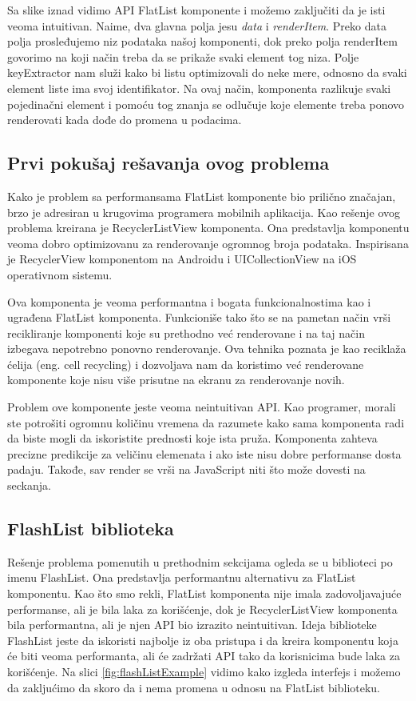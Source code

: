 \documentclass[12pt,oneside]{memoir}
\begin{document}
Sa slike iznad vidimo API FlatList komponente i možemo zaključiti da je isti veoma intuitivan. Naime, dva glavna polja jesu \textit{data} i \textit{renderItem}. Preko data polja prosleđujemo niz podataka našoj komponenti, dok preko polja renderItem govorimo na koji način treba da se prikaže svaki element tog niza. Polje keyExtractor nam služi kako bi listu optimizovali do neke mere, odnosno da svaki element liste ima svoj identifikator. Na ovaj način, komponenta razlikuje svaki pojedinačni element i pomoću tog znanja se odlučuje koje elemente treba ponovo renderovati kada dođe do promena u podacima.

\subsection{Prvi pokušaj rešavanja ovog problema}

Kako je problem sa performansama FlatList komponente bio prilično značajan, brzo je adresiran u krugovima programera mobilnih aplikacija. Kao rešenje ovog problema kreirana je RecyclerListView komponenta\cite{RecyclerListView}. Ona predstavlja komponentu veoma dobro optimizovanu za renderovanje ogromnog broja podataka. Inspirisana je RecyclerView komponentom na Androidu i UICollectionView na iOS operativnom sistemu. 


Ova komponenta je veoma performantna i bogata funkcionalnostima kao i ugrađena FlatList komponenta. Funkcioniše tako što se na pametan način vrši recikliranje komponenti koje su prethodno već renderovane i na taj način izbegava nepotrebno ponovno renderovanje. Ova tehnika poznata je kao reciklaža ćelija (eng. cell recycling) i dozvoljava nam da koristimo već renderovane komponente koje nisu više prisutne na ekranu za renderovanje novih.


Problem ove komponente jeste veoma neintuitivan API. Kao programer, morali ste potrošiti ogromnu količinu vremena da razumete kako sama komponenta radi da biste mogli da iskoristite prednosti koje ista pruža. Komponenta zahteva precizne predikcije za veličinu elemenata i ako iste nisu dobre performanse dosta padaju. Takođe, sav render se vrši na JavaScript niti što može dovesti na seckanja.

\subsection{FlashList biblioteka}

Rešenje problema pomenutih u prethodnim sekcijama ogleda se u biblioteci po imenu FlashList\cite{FlashList}. Ona predstavlja performantnu alternativu za FlatList komponentu. Kao što smo rekli, FlatList komponenta nije imala zadovoljavajuće performanse, ali je bila laka za korišćenje, dok je RecyclerListView komponenta bila performantna, ali je njen API bio izrazito neintuitivan. Ideja biblioteke FlashList jeste da iskoristi najbolje iz oba pristupa i da kreira komponentu koja će biti veoma performanta, ali će zadržati API tako da korisnicima bude laka za korišćenje. Na slici \ref{fig:flashListExample} vidimo kako izgleda interfejs i možemo da zakljućimo da skoro da i nema promena u odnosu na FlatList biblioteku.
\end{document}

